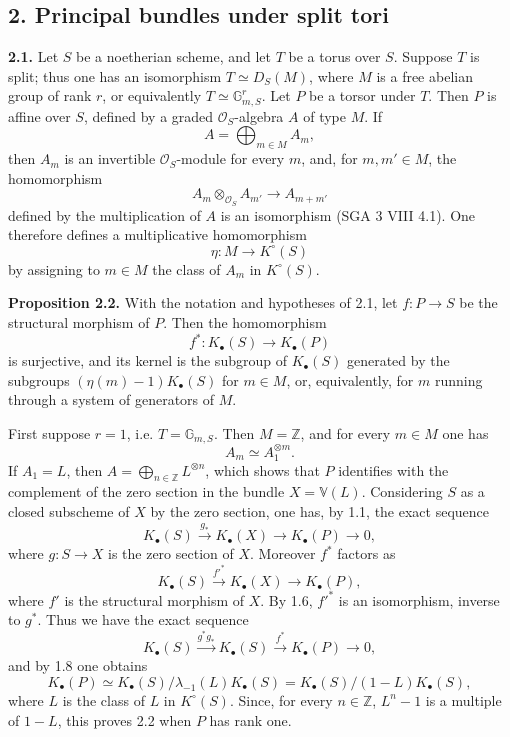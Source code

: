 \subsection*{2. Principal bundles under split tori}

\textbf{2.1.} Let $S$ be a noetherian scheme, and let $T$ be a torus over $S$. Suppose $T$ is split; thus one has an isomorphism $T\simeq D_S(M)$, where $M$ is a free abelian group of rank $r$, or equivalently $T\simeq \mathbb G_{m,S}^r$. Let $P$ be a torsor under $T$. Then $P$ is affine over $S$, defined by a graded $\mathcal O_S$-algebra $A$ of type $M$. If
\[
 A=\bigoplus_{m\in M}A_m,
\]
then $A_m$ is an invertible $\mathcal O_S$-module for every $m$, and, for $m,m'\in M$, the homomorphism
\[
 A_m\otimes_{\mathcal O_S}A_{m'}\longrightarrow A_{m+m'}
\]
defined by the multiplication of $A$ is an isomorphism (SGA 3 VIII 4.1). One therefore defines a multiplicative homomorphism
\[
 \eta:M\longrightarrow K^\circ(S)
\]
by assigning to $m\in M$ the class of $A_m$ in $K^\circ(S)$.

\textbf{Proposition 2.2.} With the notation and hypotheses of 2.1, let $f:P\to S$ be the structural morphism of $P$. Then the homomorphism
\[
 f^*:K_\bullet(S)\longrightarrow K_\bullet(P)
\]
is surjective, and its kernel is the subgroup of $K_\bullet(S)$ generated by the subgroups $(\eta(m)-1)K_\bullet(S)$ for $m\in M$, or, equivalently, for $m$ running through a system of generators of $M$.

First suppose $r=1$, i.e. $T=\mathbb G_{m,S}$. Then $M=\mathbb Z$, and for every $m\in M$ one has
\[
 A_m\simeq A_1^{\otimes m}.
\]
If $A_1=L$, then $A=\bigoplus_{n\in\mathbb Z}L^{\otimes n}$, which shows that $P$ identifies with the complement of the zero section in the bundle $X=\mathbb V(L)$. Considering $S$ as a closed subscheme of $X$ by the zero section, one has, by 1.1, the exact sequence
\[
 K_\bullet(S)\xrightarrow{g_*}K_\bullet(X)\longrightarrow K_\bullet(P)\longrightarrow 0,
\]
where $g:S\to X$ is the zero section of $X$. Moreover $f^*$ factors as
\[
 K_\bullet(S)\xrightarrow{f'^*}K_\bullet(X)\longrightarrow K_\bullet(P),
\]
where $f'$ is the structural morphism of $X$. By 1.6, $f'^*$ is an isomorphism, inverse to $g^*$. Thus we have the exact sequence
\[
 K_\bullet(S)\xrightarrow{g^*g_*}K_\bullet(S)\xrightarrow{f^*}K_\bullet(P)\longrightarrow 0,
\]
and by 1.8 one obtains
\[
 K_\bullet(P)\simeq K_\bullet(S)/\lambda_{-1}(L)K_\bullet(S)=K_\bullet(S)/(1-L)K_\bullet(S),
\]
where $L$ is the class of $L$ in $K^\circ(S)$. Since, for every $n\in\mathbb Z$, $L^n-1$ is a multiple of $1-L$, this proves 2.2 when $P$ has rank one.

